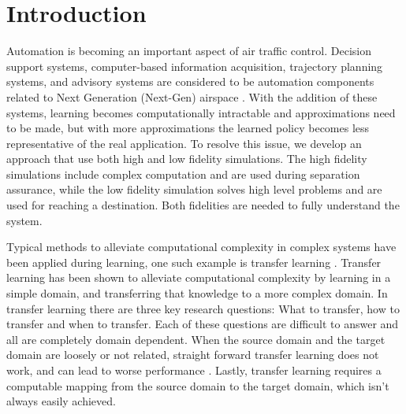 \documentclass{aamas2014}
\begin{document}



\section{Introduction}

Automation is becoming an important aspect of air traffic control. Decision support systems, computer-based information acquisition, trajectory planning systems, and advisory systems are considered to be automation components related to Next Generation (Next-Gen) airspace \cite{next-gen}. With the addition of these systems, learning becomes computationally intractable and approximations need to be made, but with more approximations the learned policy becomes less representative of the real application. To resolve this issue, we develop an approach that use both high and low fidelity simulations. The high fidelity simulations include complex computation and are used during separation assurance, while the low fidelity simulation solves high level problems and are used for reaching a destination. Both fidelities are needed to fully understand the system.

Typical methods to alleviate computational complexity in complex systems have been applied during learning, one such example is transfer learning \cite{Pan:2010:STL:1850483.1850545}. Transfer learning has been shown to alleviate computational complexity by learning in a simple domain, and transferring that knowledge to a more complex domain. In transfer learning there are three key research questions: What to transfer, how to transfer and when to transfer. Each of these questions are difficult to answer and all are completely domain dependent. When the source domain and the target domain are loosely or not related, straight forward transfer learning does not work, and can lead to worse performance \cite{Pan:2010:STL:1850483.1850545}. Lastly, transfer learning requires a computable mapping from the source domain to the target domain, which isn't always easily achieved.
\end{document}

